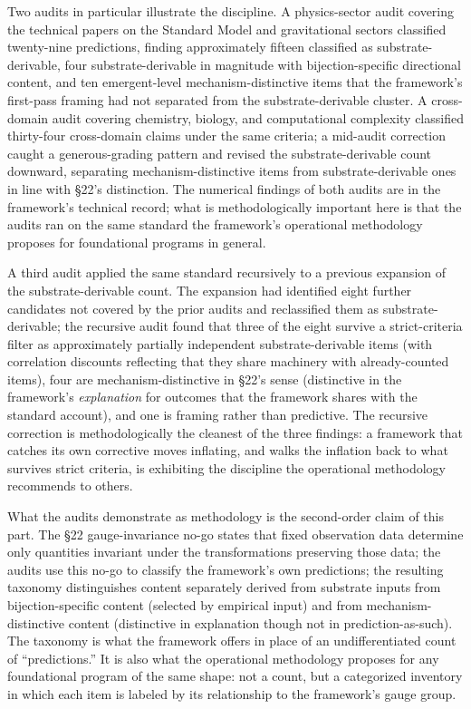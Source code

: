 \documentclass[
]{article}
\begin{document}
Two audits in particular illustrate the discipline. A physics-sector
audit covering the technical papers on the Standard Model and
gravitational sectors classified twenty-nine predictions, finding
approximately fifteen classified as substrate-derivable, four
substrate-derivable in magnitude with bijection-specific directional
content, and ten emergent-level mechanism-distinctive items that the
framework's first-pass framing had not separated from the
substrate-derivable cluster. A cross-domain audit covering chemistry,
biology, and computational complexity classified thirty-four
cross-domain claims under the same criteria; a mid-audit correction
caught a generous-grading pattern and revised the substrate-derivable
count downward, separating mechanism-distinctive items from
substrate-derivable ones in line with §22's distinction. The numerical
findings of both audits are in the framework's technical record; what is
methodologically important here is that the audits ran on the same
standard the framework's operational methodology proposes for
foundational programs in general.

A third audit applied the same standard recursively to a previous
expansion of the substrate-derivable count. The expansion had identified
eight further candidates not covered by the prior audits and
reclassified them as substrate-derivable; the recursive audit found that
three of the eight survive a strict-criteria filter as approximately
partially independent substrate-derivable items (with correlation
discounts reflecting that they share machinery with already-counted
items), four are mechanism-distinctive in §22's sense (distinctive in
the framework's \emph{explanation} for outcomes that the framework
shares with the standard account), and one is framing rather than
predictive. The recursive correction is methodologically the cleanest of
the three findings: a framework that catches its own corrective moves
inflating, and walks the inflation back to what survives strict
criteria, is exhibiting the discipline the operational methodology
recommends to others.

What the audits demonstrate as methodology is the second-order claim of
this part. The §22 gauge-invariance no-go states that fixed observation
data determine only quantities invariant under the transformations
preserving those data; the audits use this no-go to classify the
framework's own predictions; the resulting taxonomy distinguishes
content separately derived from substrate inputs from bijection-specific
content (selected by empirical input) and from mechanism-distinctive
content (distinctive in explanation though not in prediction-as-such).
The taxonomy is what the framework offers in place of an
undifferentiated count of ``predictions.'' It is also what the
operational methodology proposes for any foundational program of the
same shape: not a count, but a categorized inventory in which each item
is labeled by its relationship to the framework's gauge group.
\end{document}
